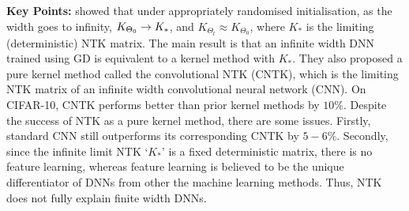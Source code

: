 \textbf{Key Points:} \citet{arora2019exact} showed that under appropriately randomised initialisation, as the width goes to infinity, $K_{\Theta_0}\rightarrow K_*$, and $K_{\Theta_t}\approx K_{\Theta_0}$, where $K_*$ is the limiting (deterministic) NTK matrix. The main result is that an infinite width DNN trained using GD is equivalent to a kernel method with $K_*$.  They also proposed a pure kernel method  called the convolutional NTK (CNTK), which is the limiting NTK matrix  of an infinite width convolutional neural network (CNN). On CIFAR-10, CNTK  performs better than prior kernel methods by $10\%$. Despite the success of NTK as a pure kernel method, there are some issues.  Firstly, standard CNN still outperforms its corresponding CNTK by $5-6\%$. Secondly, since the infinite limit NTK `$K_*$' is a fixed deterministic matrix, there is no feature learning, whereas feature learning is believed to be the unique differentiator of DNNs from other the machine learning methods. Thus, NTK does not fully explain finite width DNNs. 
